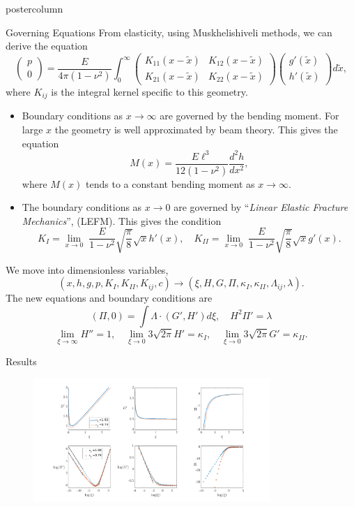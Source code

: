 \documentclass{beamer}
\begin{document}
\begin{frame}
\begin{columns}
\begin{column}{.43\textwidth}
\begin{beamercolorbox}[center]{postercolumn}
\begin{minipage}{.98\textwidth}
{\begin{myblock}{Governing Equations}
From elasticity, using Muskhelishiveli methods, we can derive the equation
\[
\left( \begin{array}{c} p \\ 0 \end{array} \right)   =
\frac{E}{4\pi (1-\nu^2)} \int_0^{\infty}
\left(\begin{array}{cc} K_{11}(x-\tilde{x}) & K_{12}(x-\tilde{x}) \\ 
K_{21}(x-\tilde{x}) & K_{22}(x-\tilde{x}) \end{array} \right)
\left( \begin{array}{c} g'(\tilde{x}) \\ h'(\tilde{x}) \end{array} 
\right)d\tilde{x},  \]
where $K_{ij}$ is the integral kernel specific to this geometry.
\begin{itemize}
\item Boundary conditions as $x\to\infty$ are governed by the bending moment.
      For large $x$ the geometry is well approximated by beam theory. This 
      gives the equation 
      \[ M(x) = \frac{E\ell^3}{12(1-\nu^2)}\frac{d^2h}{dx^2}, \]
      where $M(x)$ tends to a constant bending moment as $x\to \infty$.
\item The boundary conditions as $x\to0$ are governed by ``\emph{Linear Elastic
      Fracture Mechanics}'', (LEFM). This gives the condition
      \[K_I = \lim_{x\to 0} \; \frac{E}{1-\nu^2}\sqrt{\frac{\pi}{8}} \sqrt{x}
      h'(x), \quad K_{II} = \lim_{x\to 0} \; \frac{E}{1-\nu^2}
      \sqrt{\frac{\pi}{8}} \sqrt{x} g'(x). \]
\end{itemize}
We move into dimensionless variables, 
\[(x,h,g,p,K_I,K_{II},K_{ij},c) \to (\xi, H,G,\Pi, \kappa_{I},\kappa_{II}, 
\Lambda_{ij},\lambda). \]
The new equations and boundary conditions are
\[(\Pi,0) = \int \Lambda \cdot (G',H') d\xi, \quad H^2\Pi' = \lambda\]
\[\lim_{\xi \to \infty} H'' = 1, \quad \lim_{\xi \to 0} 3\sqrt{2\pi}H' 
= \kappa_I,  \quad \lim_{\xi \to 0} 3\sqrt{2\pi}G' 
= \kappa_{II}. \]
\end{myblock}\vfill
\begin{myblock}{Results}
\begin{figure}
\centering\includegraphics[width=0.8\textwidth]{../../Graphs/hprime-p-x-full.png}

\end{figure}
\end{myblock}}
\end{minipage}
\end{beamercolorbox}
\end{column}
\end{columns}
\end{frame}
\end{document}
